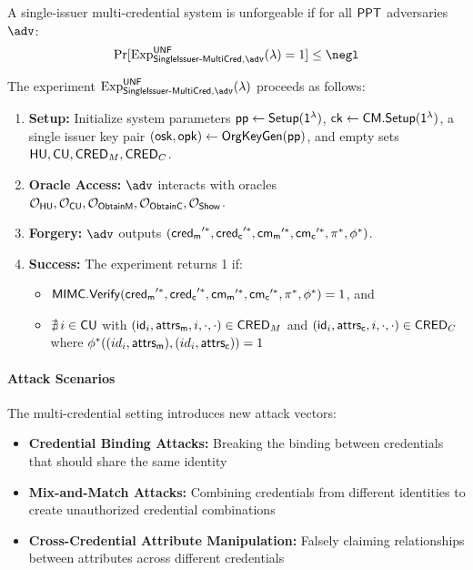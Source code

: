 \begin{definition}
A single-issuer multi-credential system is unforgeable if for all $\mathsf{PPT}$ adversaries $\adv$:
\[
\Pr[\mathrm{Exp}^{\mathsf{UNF}}_{\mathsf{SingleIssuer\text{-}MultiCred}, \adv}(\lambda) = 1] \leq \negl
\]
\end{definition}

\noindent The experiment $\mathrm{Exp}^{\mathsf{UNF}}_{\mathsf{SingleIssuer\text{-}MultiCred}, \adv}(\lambda)$ proceeds as follows:

\begin{enumerate}
    \item \textbf{Setup:} Initialize system parameters $\mathsf{pp} \gets \mathsf{Setup}(\mathsf{1^{\lambda}})$, $\mathsf{ck} \gets \mathsf{CM.Setup}(\mathsf{1^{\lambda}})$, a single issuer key pair $(\mathsf{osk}, \mathsf{opk}) \gets \mathsf{OrgKeyGen}(\mathsf{pp})$, and empty sets $\mathsf{HU}, \mathsf{CU}, \mathsf{CRED}_M, \mathsf{CRED}_C$.
    
    \item \textbf{Oracle Access:} $\adv$ interacts with oracles $\mathcal{O}_{\mathsf{HU}}, \mathcal{O}_{\mathsf{CU}}, \mathcal{O}_{\mathsf{ObtainM}}, \mathcal{O}_{\mathsf{ObtainC}}, \mathcal{O}_{\mathsf{Show}}$.
    
    \item \textbf{Forgery:} $\adv$ outputs $(\mathsf{cred_m}'^*, \mathsf{cred_c}'^*, \mathsf{cm_m}'^*, \mathsf{cm_c}'^*, \pi^*, \phi^*)$.
    
    \item \textbf{Success:} The experiment returns 1 if:
    \begin{itemize}
        \item $\mathsf{MIMC.Verify}(\mathsf{cred_m}'^*, \mathsf{cred_c}'^*, \mathsf{cm_m}'^*, \mathsf{cm_c}'^*, \pi^*, \phi^*) = 1$, and
        \item $\nexists\, i \in \mathsf{CU}$ with $(\mathsf{id}_i, \mathsf{attrs_m}, i, \cdot, \cdot) \in \mathsf{CRED}_M$ and $(\mathsf{id}_i, \mathsf{attrs_c}, i, \cdot, \cdot) \in \mathsf{CRED}_C$ where $\phi^*((id_i, \mathsf{attrs_m}), (id_i, \mathsf{attrs_c})) = 1$
    \end{itemize}
\end{enumerate}

\paragraph{Attack Scenarios}
The multi-credential setting introduces new attack vectors:
\begin{itemize}
    \item \textbf{Credential Binding Attacks:} Breaking the binding between credentials that should share the same identity
    \item \textbf{Mix-and-Match Attacks:} Combining credentials from different identities to create unauthorized credential combinations
    \item \textbf{Cross-Credential Attribute Manipulation:} Falsely claiming relationships between attributes across different credentials
\end{itemize}

